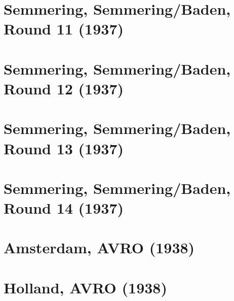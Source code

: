 \documentclass[11pt]{article}
\begin{document}
\clearpage

\section{Semmering, Semmering/Baden, Round 11 (1937)}


\clearpage

\section{Semmering, Semmering/Baden, Round 12 (1937)}


\clearpage

\section{Semmering, Semmering/Baden, Round 13 (1937)}


\clearpage

\section{Semmering, Semmering/Baden, Round 14 (1937)}


\clearpage

\section{Amsterdam, AVRO (1938)}


\clearpage

\section{Holland, AVRO (1938)}


\clearpage



\clearpage



\clearpage



\clearpage



\clearpage



\clearpage


\end{document}
